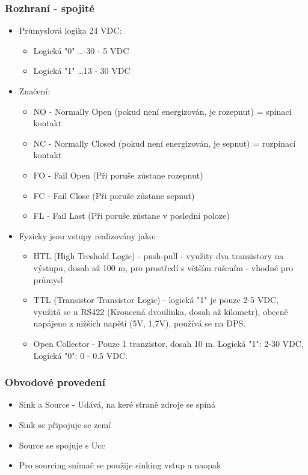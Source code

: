\subsubsection*{Rozhraní - spojité}
\begin{itemize}
  \item Průmyslová logika 24 VDC: \begin{itemize}
    \item Logická "0" \dots -30 - 5 VDC
    \item Logická "1" \dots 13 - 30 VDC
  \end{itemize}
  \item Značení: \begin{itemize}
    \item NO - Normally Open (pokud není energizován, je rozepnut) = spínací kontakt
    \item NC - Normally Closed (pokud není energizován, je sepnut) = rozpínací kontakt
    \item FO - Fail Open (Při poruše zůstane rozepnut)
    \item FC - Fail Close (Při poruše zůstane sepnut)
    \item FL - Fail Last (Při poruše zůstane v poslední poloze)
  \end{itemize}
  	\item Fyzicky jsou vstupy realizovány jako: \begin{itemize}
      \item HTL (High Treshold Logic) - push-pull - využity dva tranzistory na výstupu, dosah až 100 m, pro prostředí s větším rušením - vhodné pro průmysl
      \item TTL (Transistor Transistor Logic) - logická "1" je pouze 2-5 VDC, využitá se u RS422 (Kroucená dvoulinka, dosah až kilometr), obecně napájeno z nižších napětí (5V, 1,7V), používá se na DPS.
      \item Open Collector - Pouze 1 tranzistor, dosah 10 m. Logická "1": 2-30 VDC, Logická "0": 0 - 0.5 VDC.
    \end{itemize}
  \end{itemize}
  
  \subsubsection*{Obvodové provedení}
  \begin{itemize}
    \item Sink a Source - Udává, na keré straně zdroje se spíná
    \item Sink se připojuje se zemí
    \item Source se spojuje s Ucc
    \item Pro sourcing snímač se použije sinking vstup a naopak 
  \end{itemize}

